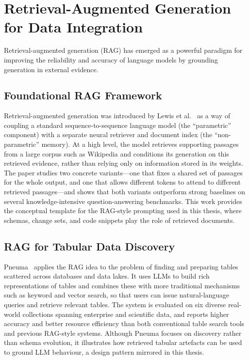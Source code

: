 \section{Retrieval-Augmented Generation for Data Integration}
\label{sec:related-rag}

Retrieval-augmented generation (RAG) has emerged as a powerful paradigm for improving the reliability and accuracy of language models by grounding generation in external evidence.

\subsection{Foundational RAG Framework}

Retrieval-augmented generation was introduced by Lewis et al.~\cite{lewis2020retrieval} as a way of coupling a standard sequence-to-sequence language model (the ``parametric'' component) with a separate neural retriever and document index (the ``non-parametric'' memory). At a high level, the model retrieves supporting passages from a large corpus such as Wikipedia and conditions its generation on this retrieved evidence, rather than relying only on information stored in its weights. The paper studies two concrete variants---one that fixes a shared set of passages for the whole output, and one that allows different tokens to attend to different retrieved passages---and shows that both variants outperform strong baselines on several knowledge-intensive question-answering benchmarks. This work provides the conceptual template for the RAG-style prompting used in this thesis, where schemas, change sets, and code snippets play the role of retrieved documents.

\subsection{RAG for Tabular Data Discovery}

Pneuma~\cite{pneuma2025} applies the RAG idea to the problem of finding and preparing tables scattered across databases and data lakes. It uses LLMs to build rich representations of tables and combines these with more traditional mechanisms such as keyword and vector search, so that users can issue natural-language queries and retrieve relevant tables. The system is evaluated on six diverse real-world collections spanning enterprise and scientific data, and reports higher accuracy and better resource efficiency than both conventional table search tools and previous RAG-style systems. Although Pneuma focuses on discovery rather than schema evolution, it illustrates how retrieved tabular artefacts can be used to ground LLM behaviour, a design pattern mirrored in this thesis.


